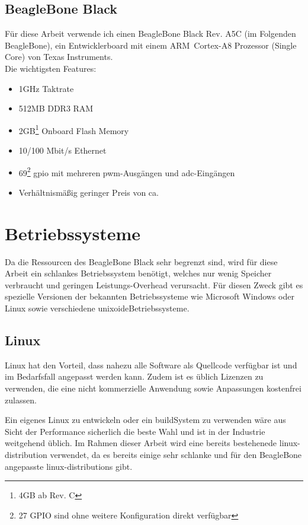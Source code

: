 \subsection{BeagleBone Black}
Für diese Arbeit verwende ich einen BeagleBone Black Rev. A5C (im Folgenden BeagleBone), ein Entwicklerboard mit einem ARM\textregistered ~Cortex\texttrademark -A8 Prozessor (Single Core) von Texas Instruments.\\

\noindent Die wichtigsten Features:
\begin{itemize}
\item 1GHz Taktrate
\item 512MB DDR3 RAM
\item 2GB\footnote{4GB ab Rev. C} Onboard Flash Memory
\item 10/100 Mbit/s Ethernet
\item 69\footnote{27 GPIO sind ohne weitere Konfiguration direkt verfügbar} \gls{gpio} mit mehreren \gls{pwm}-Ausgängen und \gls{adc}-Eingängen
\item Verhältnismäßig geringer Preis von ca. 
\end{itemize}


\section{Betriebssysteme}
Da die Ressourcen des BeagleBone Black sehr begrenzt sind, wird für diese Arbeit ein schlankes Betriebssystem benötigt, welches nur wenig Speicher verbraucht und geringen Leistungs-Overhead verursacht. Für diesen Zweck gibt es spezielle Versionen der bekannten Betriebssysteme wie Microsoft Windows oder Linux sowie verschiedene \gls{unixoideBetriebssysteme}.


\subsection{Linux}
Linux hat den Vorteil, dass nahezu alle Software als Quellcode verfügbar ist und im Bedarfsfall angepasst werden kann. Zudem ist es üblich Lizenzen zu verwenden, die eine nicht kommerzielle Anwendung sowie Anpassungen kostenfrei zulassen.

Ein eigenes Linux zu entwickeln oder ein \gls{buildSystem} zu verwenden wäre aus Sicht der Performance sicherlich die beste Wahl und ist in der Industrie weitgehend üblich. Im Rahmen dieser Arbeit wird eine bereits bestehenede \gls{linux-distribution} verwendet, da es bereits einige sehr schlanke und für den BeagleBone angepasste \glspl{linux-distribution} gibt.


